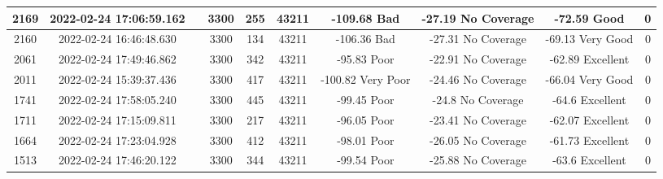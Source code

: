 \begin{longtable*}{|c|c|c|c|c|c|c|c|c|c|}
2169&2022-02-24 17:06:59.162&&3300&255&43211& -109.68   Bad         & -27.19    No Coverage & -72.59    Good        & 0\\\hline
{}2160&2022-02-24 16:46:48.630&&3300&134&43211& -106.36   Bad         & -27.31    No Coverage & -69.13    Very Good   & 0\\\hline
{}2061&2022-02-24 17:49:46.862&&3300&342&43211& -95.83    Poor        & -22.91    No Coverage & -62.89    Excellent   & 0\\\hline
{}2011&2022-02-24 15:39:37.436&&3300&417&43211& -100.82   Very Poor   & -24.46    No Coverage & -66.04    Very Good   & 0\\\hline
{}1741&2022-02-24 17:58:05.240&&3300&445&43211& -99.45    Poor        & -24.8     No Coverage & -64.6     Excellent   & 0\\\hline
{}1711&2022-02-24 17:15:09.811&&3300&217&43211& -96.05    Poor        & -23.41    No Coverage & -62.07    Excellent   & 0\\\hline
{}1664&2022-02-24 17:23:04.928&&3300&412&43211& -98.01    Poor        & -26.05    No Coverage & -61.73    Excellent   & 0\\\hline
{}1513&2022-02-24 17:46:20.122&&3300&344&43211& -99.54    Poor        & -25.88    No Coverage & -63.6     Excellent   & 0\\\hline

\end{longtable*}
